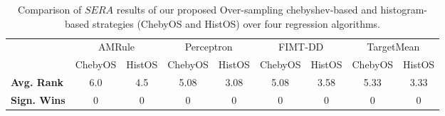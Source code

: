     \begin{table}[!htb]
        \centering
        \caption{Comparison of $SERA$ results of our proposed Over-sampling chebyshev-based and histogram-based strategies (ChebyOS and HistOS) over four regression algorithms.}
        \label{tab:Sum_ChebyOS_HistOS_SERA_Over}
        \begin{tabular}{ |l|c|c|c|c|c|c|c|c|}
        \hline
            \multirow{2}{4em}{ }&
            \multicolumn{2}{|c|}{AMRule} &
            \multicolumn{2}{|c|}{Perceptron} &
            \multicolumn{2}{|c|}{FIMT-DD} &
            \multicolumn{2}{|c|}{TargetMean}
        \\
        \cline{2-9}
        & ChebyOS & HistOS & ChebyOS & HistOS & ChebyOS & HistOS &
        ChebyOS & HistOS \\
        \hline
        {\bf Avg. Rank} & 6.0 & 4.5 & 5.08 & 3.08 & 5.08 & 3.58 & 5.33 & 3.33 \\
        \hline
        {\bf Sign. Wins} & 0 & 0 & 0 & 0 & 0 & 0 & 0 & 0 \\
        \hline
        \end{tabular}
    \end{table}